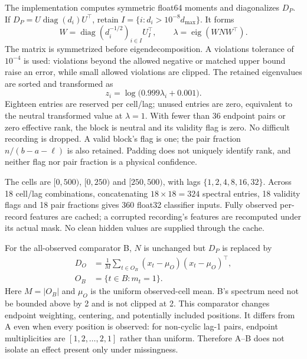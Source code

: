The implementation computes symmetric float64 moments and diagonalizes $D_P$.
If $D_P=U\operatorname{diag}(d_i)U^\top$, retain
$I=\{i:d_i>10^{-8}d_{\max}\}$. It forms
\begin{equation}
 W=\operatorname{diag}(d_i^{-1/2})_{i\in I}U_I^\top,\qquad
 \lambda=\operatorname{eig}(WNW^\top).
 \label{eq:m2-whiten}
\end{equation}
The matrix is symmetrized before eigendecomposition. A violations tolerance
of $10^{-4}$ is used: violations beyond the allowed negative or matched upper
bound raise an error, while small allowed violations are clipped. The retained
eigenvalues are sorted and transformed as
\begin{equation}
 z_i=\log\big(0.999\lambda_i+0.001\big).
 \label{eq:m2-log}
\end{equation}
Eighteen entries are reserved per cell/lag; unused entries are zero, equivalent
to the neutral transformed value at $\lambda=1$. With fewer than 36 endpoint
pairs or zero effective rank, the block is neutral and its validity flag is
zero. No difficult recording is dropped. A valid block's flag is one; the
pair fraction $n/(b-a-\ell)$ is also retained. Padding does not uniquely
identify rank, and neither flag nor pair fraction is a physical confidence.

The cells are $[0,500)$, $[0,250)$ and $[250,500)$, with lags
$\{1,2,4,8,16,32\}$. Across 18 cell/lag combinations, concatenating
$18\times18=324$ spectral entries, 18 validity flags and 18 pair fractions
gives 360 float32 classifier inputs. Fully observed per-record features are
cached; a corrupted recording's features are recomputed under its actual mask.
No clean hidden values are supplied through the cache.

For the all-observed comparator B, $N$ is unchanged but $D_P$ is replaced by
\begin{equation}
 \begin{aligned}
 D_O&=\frac{1}{M}\sum_{t\in O_B}(x_t-\mu_O)(x_t-\mu_O)^\top,\\
 O_B&=\{t\in B:m_t=1\}.
 \end{aligned}
 \label{eq:m2-B}
\end{equation}
Here $M=|O_B|$ and $\mu_O$ is the uniform observed-cell mean. B's spectrum
need not be bounded above by 2 and is not clipped at 2. This comparator
changes endpoint weighting, centering, and potentially included positions.
It differs from A even when every position is observed: for non-cyclic lag-1
pairs, endpoint multiplicities are $[1,2,\ldots,2,1]$ rather than uniform.
Therefore A--B does not isolate an effect present only under missingness.

